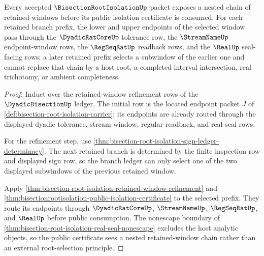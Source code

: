 \begin{theorem}
\label{thm:bisection-root-isolation-interval-nesting}
Every accepted $\BisectionRootIsolationUp$ packet exposes a nested chain of retained windows before its public isolation certificate is consumed. For each retained branch prefix, the lower and upper endpoints of the selected window pass through the $\DyadicRatCoreUp$ tolerance row, the $\StreamNameUp$ endpoint-window rows, the $\RegSeqRatUp$ readback rows, and the $\RealUp$ seal-facing rows; a later retained prefix selects a subwindow of the earlier one and cannot replace that chain by a host root, a completed interval intersection, real trichotomy, or ambient completeness.
\end{theorem}
\begin{proof}
Induct over the retained-window refinement rows of the $\DyadicBisectionUp$ ledger. The initial row is the located endpoint packet $J$ of \autoref{def:bisection-root-isolation-carrier}; its endpoints are already routed through the displayed dyadic tolerance, stream-window, regular-readback, and real-seal rows.

For the refinement step, use \autoref{thm:bisection-root-isolation-sign-ledger-determinacy}. The next retained branch is determined by the finite inspection row and displayed sign row, so the branch ledger can only select one of the two displayed subwindows of the previous retained window.

Apply \autoref{thm:bisection-root-isolation-retained-window-refinement} and \autoref{thm:bisectionrootisolation-public-isolation-certificate} to the selected prefix. They route its endpoints through $\DyadicRatCoreUp$, $\StreamNameUp$, $\RegSeqRatUp$, and $\RealUp$ before public consumption. The nonescape boundary of \autoref{thm:bisection-root-isolation-real-seal-nonescape} excludes the host analytic objects, so the public certificate sees a nested retained-window chain rather than an external root-selection principle.
\end{proof}

